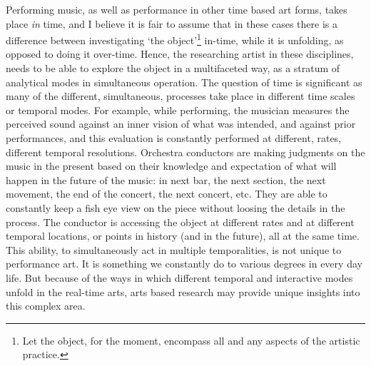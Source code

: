 Performing music, as well as performance in other time based art forms, takes place \emph{in} time, and I believe it is fair to assume that in these cases there is a difference between investigating `the object'\footnote{Let the object, for the moment, encompass all and any aspects of the artistic practice.} in-time, while it is unfolding, as opposed to doing it over-time. Hence, the researching artist in these disciplines, needs to be able to explore the object in a multifaceted way, as a stratum of analytical modes in simultaneous operation. The question of time is significant as many of the different, simultaneous, processes take place in  different time scales or temporal modes. For example, while performing, the musician measures the perceived sound against an inner vision of what was intended, and against prior performances, and this evaluation is constantly performed at different, rates, different temporal resolutions. Orchestra conductors are making judgments on the music in the present based on their knowledge and expectation of what will happen in the future of the music: in next bar, the next section, the next movement, the end of the concert, the next concert, etc. They are able to constantly keep a fish eye view on the piece without loosing the details in the process. The conductor is accessing the object at different rates and at different temporal locations, or points in history (and in the future), all at the same time. This ability, to simultaneously act in multiple temporalities, is not unique to performance art. It is something we constantly do to various degrees in every day life. But because of the ways in which different temporal and interactive modes unfold in the real-time arts, arts based research may provide unique insights into this complex area. 



